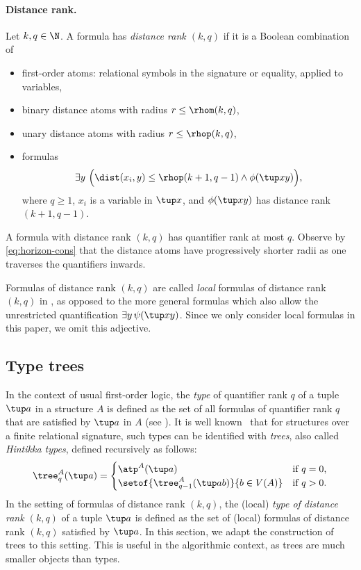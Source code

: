 \paragraph{Distance rank.}
Let $k,q\in\N$.
A \distFO formula has \emph{distance rank \((k,q)\)} if it is a Boolean combination of
\begin{itemize}
\item first-order atoms: relational symbols in the signature or equality, applied to variables,
\item binary distance atoms with radius $r\le\rhom(k,q)$,
\item unary distance atoms with radius $r\le\rhop(k,q)$,
\item
formulas
\[
\exists y~\Bigl(\dist(x_i,y)\le \rhop(k+1,q-1)\land\phi(\tup x y)\Bigr),
\]
where \(q \ge 1\), $x_i$ is a variable in $\tup x$, and $\phi(\tup x y)$ has distance rank $(k+1,q-1)$.
\end{itemize}

A formula with distance rank \((k,q)\) has quantifier rank at most \(q\).
Observe by \eqref{eq:horizon-cons} that
the distance atoms have progressively shorter radii as one traverses the quantifiers
inwards.

Formulas of distance rank $(k,q)$ are called \emph{local} formulas of distance rank $(k,q)$ in
\cite{mw-arxiv,locality-note}, as opposed to the more general formulas which also allow the unrestricted quantification $\exists y\, \psi(\tup x y)$. Since we only consider local formulas in this paper, we omit this adjective.


\subsection{Type trees}
\label{sec:typetrees}
 In the context of usual first-order logic, the \emph{type} of quantifier rank $q$ of a tuple $\tup a$ in a structure $A$ is defined as the set of all formulas of quantifier rank $q$ that are satisfied by $\tup a$ in $A$ (see ). It is well known~\cite{Scott1979}
  that for structures over a finite relational signature, such types can be identified with \emph{trees}, also called \emph{Hintikka types},
defined recursively as follows:
$$\tree_q^A(\tup a)=\begin{cases}
\atp^A(\tup a)&\text{if $q=0$,}\\
\setof{\tree_{q-1}^A(\tup a b)}{b\in V(A)}&\text{if $q>0$}.
\end{cases}$$
In the setting of \distFO formulas of distance rank $(k,q)$, the (local) \emph{type of distance rank $(k,q)$} of a tuple $\tup a$
is defined  \cite{mw-arxiv} as the set of (local) \distFO formulas of distance rank $(k,q)$ satisfied by $\tup a$.
In this section, we adapt the construction of trees to this setting. This is useful in the algorithmic context, as trees are much smaller objects than types.

